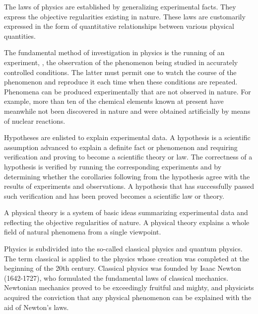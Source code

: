 The laws of physics are established by generalizing experimental facts. They express the objective regularities existing in nature. These laws are customarily expressed in the form of quantitative relationships between various physical quantities.

The fundamental method of investigation in physics is the running of an experiment, \ie, the observation of the phenomenon being studied in accurately controlled conditions. The latter must permit one to watch the course of the phenomenon and reproduce it each time when these conditions are repeated. Phenomena can be produced experimentally that are not observed in nature. For example, more than ten of the chemical elements known at present have meanwhile not been discovered in nature and were obtained artificially by means of nuclear reactions.

Hypotheses are enlisted to explain experimental data. A hypothesis is a scientific assumption advanced to explain a definite fact or phenomenon and requiring verification and proving to become a scientific theory or law. The correctness of a hypothesis is verified by running the corresponding experiments and by determining whether the corollaries following from the hypothesis agree with the results of experiments and observations. A hypothesis that has successfully passed such verification and has been proved becomes a scientific law or theory.

A physical theory is a system of basic ideas summarizing experimental data and reflecting the objective regularities of nature. A physical theory explains a whole field of natural phenomena from a single viewpoint.

Physics is subdivided into the so-called classical physics and quantum physics. The term classical is applied to the physics whose creation was completed at the beginning of the 20th century. Classical physics was founded by Isaac Newton (1642-1727), who formulated the fundamental laws of classical mechanics. Newtonian mechanics proved to be exceedingly fruitful and mighty, and physicists acquired the conviction that any physical phenomenon can be explained with the aid of Newton's laws.

